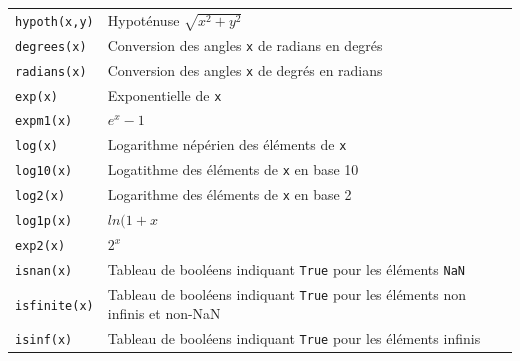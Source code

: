 \documentclass[
  12pt,
]{book}
\numberwithin{equation}{section}
\numberwithin{countremarque}{section}
\begin{document}
\begin{longtable}[]{@{}
  >{\raggedleft\arraybackslash}p{}
  >{\raggedleft\arraybackslash}p{}@{}}
\texttt{hypoth(x,y)} & Hypoténuse \(\sqrt{x^2+y^2}\) \\
\texttt{degrees(x)} & Conversion des angles \texttt{x} de radians en degrés \\
\texttt{radians(x)} & Conversion des angles \texttt{x} de degrés en radians \\
\texttt{exp(x)} & Exponentielle de \texttt{x} \\
\texttt{expm1(x)} & \(e^x-1\) \\
\texttt{log(x)} & Logarithme népérien des éléments de \texttt{x} \\
\texttt{log10(x)} & Logatithme des éléments de \texttt{x} en base 10 \\
\texttt{log2(x)} & Logarithme des éléments de \texttt{x} en base 2 \\
\texttt{log1p(x)} & \(ln(1+x\) \\
\texttt{exp2(x)} & \(2^x\) \\
\texttt{isnan(x)} & Tableau de booléens indiquant \texttt{True} pour les éléments \texttt{NaN} \\
\texttt{isfinite(x)} & Tableau de booléens indiquant \texttt{True} pour les éléments non infinis et non-NaN \\
\texttt{isinf(x)} & Tableau de booléens indiquant \texttt{True} pour les éléments infinis \\
\end{longtable}
\end{document}
